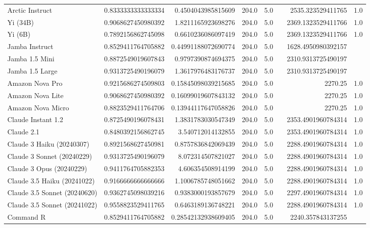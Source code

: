 \begin{table}[htp]
{\begin{tabular}{lrrrrrrr}
Arctic Instruct & 0.8333333333333334 & 0.4504043985815609 & 204.0 & 5.0 &  & 2535.323529411765 & 1.0 \\
Yi (34B) & 0.9068627450980392 & 1.8211165923698276 & 204.0 & 5.0 &  & 2369.1323529411766 & 1.0 \\
Yi (6B) & 0.7892156862745098 & 0.6610236086097419 & 204.0 & 5.0 &  & 2369.1323529411766 & 1.0 \\
Jamba Instruct & 0.8529411764705882 & 0.44991188072690774 & 204.0 & 5.0 &  & 1628.4950980392157 &  \\
Jamba 1.5 Mini & 0.8872549019607843 & 0.9797390874694375 & 204.0 & 5.0 &  & 2310.9313725490197 &  \\
Jamba 1.5 Large & 0.9313725490196079 & 1.3617976483176737 & 204.0 & 5.0 &  & 2310.9313725490197 &  \\
Amazon Nova Pro & 0.9215686274509803 & 0.15845098039215685 & 204.0 & 5.0 &  & 2270.25 & 1.0 \\
Amazon Nova Lite & 0.9068627450980392 & 0.16099019607843132 & 204.0 & 5.0 &  & 2270.25 & 1.0 \\
Amazon Nova Micro & 0.8823529411764706 & 0.13944117647058826 & 204.0 & 5.0 &  & 2270.25 & 1.0 \\
Claude Instant 1.2 & 0.8725490196078431 & 1.3831783030547349 & 204.0 & 5.0 &  & 2353.4901960784314 & 1.0 \\
Claude 2.1 & 0.8480392156862745 & 3.540712014132855 & 204.0 & 5.0 &  & 2353.4901960784314 & 1.0 \\
Claude 3 Haiku (20240307) & 0.8921568627450981 & 0.8757836842069439 & 204.0 & 5.0 &  & 2288.4901960784314 & 1.0 \\
Claude 3 Sonnet (20240229) & 0.9313725490196079 & 8.072314507821027 & 204.0 & 5.0 &  & 2288.4901960784314 & 1.0 \\
Claude 3 Opus (20240229) & 0.9411764705882353 & 4.606354508914199 & 204.0 & 5.0 &  & 2288.4901960784314 & 1.0 \\
Claude 3.5 Haiku (20241022) & 0.9166666666666666 & 1.1006785748051662 & 204.0 & 5.0 &  & 2288.4901960784314 & 1.0 \\
Claude 3.5 Sonnet (20240620) & 0.9362745098039216 & 0.9383000193857679 & 204.0 & 5.0 &  & 2297.4901960784314 & 1.0 \\
Claude 3.5 Sonnet (20241022) & 0.9558823529411765 & 0.6463189136748221 & 204.0 & 5.0 &  & 2288.4901960784314 & 1.0 \\
Command R & 0.8529411764705882 & 0.28542132938609405 & 204.0 & 5.0 &  & 2240.357843137255 &  \\

\end{tabular}}
\end{table}
